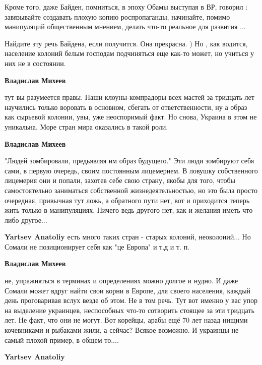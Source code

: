 \begin{itemize}
\begin{itemize}
Кроме того, даже Байден, помниться, в эпоху Обамы выступая в ВР, говорил :
завязывайте создавать плохую копию роспропаганды, начинайте, помимо манипуляций
общественным мнением, делать что-то реальное для развития ...

Найдите эту речь Байдена, если получится. Она прекрасна. ) Но , как водится,
население колоний белым господам подчиняться еще как-то может, но учиться у них
не в состоянии.


\textbf{Владислав Михеев} 

тут вы разумеется правы. Наши клоуны-компрадоры всех мастей за тридцать лет
научились только воровать в основном, сбегать от ответственности, ну а образ
как сырьевой колонии, увы, уже неоспоримый факт. Но снова, Украина в этом не
уникальна. Море стран мира оказались в такой роли.

\textbf{Владислав Михеев} 

"Людей зомбировали, предьявляя им образ будущего." Эти люди зомбируют себя
сами, в первую очередь, своим постоянным лицемерием. В ловушку собственного
лицемерия они и попали, захотев себе свою страну, якобы для того, чтобы
самостоятельно заниматься собственной жизнедеятельностью, но это была просто
очередная, привычная тут ложь, а обратного пути нет, вот и приходится теперь
жить только в манипуляциях. Ничего ведь другого нет, как и желания иметь
что-либо другое...

\textbf{Yartsev Anatoliy} есть много таких стран - старых колоний, неоколоний... Но Сомали не позиционирует себя как "це Европа" и т.д и т. п.

\textbf{Владислав Михеев} 

не, упражняться в терминах и определениях можно долгое и нудно. И даже Сомали
может вдруг найти свои корни в Европе, для своего населения, каждый день
проговаривая вслух везде об этом. Не в том речь. Тут вот именно у вас упор на
выделение украинцев, неспособных что-то сотворить стоящее за эти тридцать лет.
Не факт, что они не могут. Вот корейцы, арабы ещё 70 лет назад нищими
кочевниками и рыбаками жили, а сейчас? Всякое возможно. И украинцы не самый
плохой пример, в общем то....

\textbf{Yartsev Anatoliy} 


\end{itemize}
\end{itemize}
